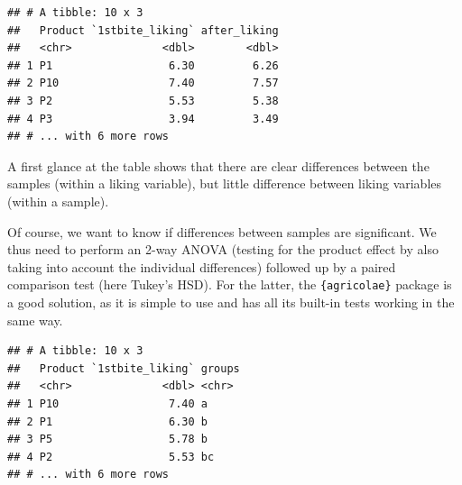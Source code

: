 \documentclass[
]{krantz}
\makeatletter
\newenvironment{Shaded}{\begin{snugshade}}{\end{snugshade}}
\newcommand{\AttributeTok}[1]{\textcolor[rgb]{0.61,0.61,0.61}{#1}}
\newcommand{\FunctionTok}[1]{\textcolor[rgb]{0,0,0}{#1}}
\newcommand{\NormalTok}[1]{#1}
\newcommand{\OtherTok}[1]{\textcolor[rgb]{0.37,0.37,0.37}{#1}}
\newcommand{\SpecialCharTok}[1]{\textcolor[rgb]{0,0,0}{#1}}
\newcommand{\StringTok}[1]{\textcolor[rgb]{0.5,0.5,0.5}{#1}}
\newenvironment{kframe}{%
\medskip{}
\setlength{\fboxsep}{.8em}
 \def\at@end@of@kframe{}%
 \ifinner\ifhmode%
  \def\at@end@of@kframe{\end{minipage}}%
  \begin{minipage}{\columnwidth}%
 \fi\fi%
 \def\FrameCommand##1{\hskip\@totalleftmargin \hskip-\fboxsep
 \colorbox{shadecolor}{##1}\hskip-\fboxsep
     \hskip-\linewidth \hskip-\@totalleftmargin \hskip\columnwidth}%
 \MakeFramed {\advance\hsize-\width
   \@totalleftmargin\z@ \linewidth\hsize
   \@setminipage}}%
 {\par\unskip\endMakeFramed%
 \at@end@of@kframe}
\renewenvironment{Shaded}{\begin{kframe}}{\end{kframe}}
\makeatother
\begin{document}
\begin{verbatim}
## # A tibble: 10 x 3
##   Product `1stbite_liking` after_liking
##   <chr>              <dbl>        <dbl>
## 1 P1                  6.30         6.26
## 2 P10                 7.40         7.57
## 3 P2                  5.53         5.38
## 4 P3                  3.94         3.49
## # ... with 6 more rows
\end{verbatim}

A first glance at the table shows that there are clear differences between the samples (within a liking variable), but little difference between liking variables (within a sample).

Of course, we want to know if differences between samples are significant. We thus need to perform an 2-way ANOVA (testing for the product effect by also taking into account the individual differences) followed up by a paired comparison test (here Tukey's HSD). For the latter, the \texttt{\{agricolae\}} package is a good solution, as it is simple to use and has all its built-in tests working in the same way.

\begin{Shaded}
\end{Shaded}

\begin{verbatim}
## # A tibble: 10 x 3
##   Product `1stbite_liking` groups
##   <chr>              <dbl> <chr> 
## 1 P10                 7.40 a     
## 2 P1                  6.30 b     
## 3 P5                  5.78 b     
## 4 P2                  5.53 bc    
## # ... with 6 more rows
\end{verbatim}
\end{document}
